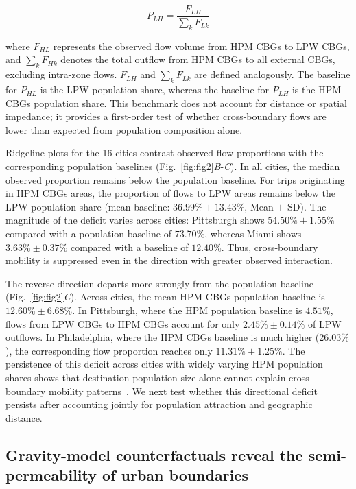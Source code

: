 \documentclass[9pt,twocolumn,twoside]{pnas-new}
\begin{document}
\begin{equation}
	P_{LH} = \frac{F_{LH}}{\sum_{k} F_{Lk}}
\end{equation}

\noindent where $F_{HL}$ represents the observed flow volume from HPM CBGs to LPW CBGs, and $\sum_{k} F_{Hk}$ denotes the total outflow from HPM CBGs to all external CBGs, excluding intra-zone flows. $F_{LH}$ and $\sum_{k} F_{Lk}$ are defined analogously. The baseline for $P_{HL}$ is the LPW population share, whereas the baseline for $P_{LH}$ is the HPM CBGs population share. This benchmark does not account for distance or spatial impedance; it provides a first-order test of whether cross-boundary flows are lower than expected from population composition alone.

Ridgeline plots for the 16 cities contrast observed flow proportions with the corresponding population baselines (Fig.~\ref{fig:fig2}\textit{B}-\textit{C}). In all cities, the median observed proportion remains below the population baseline. For trips originating in HPM CBGs areas, the proportion of flows to LPW areas remains below the LPW population share (mean baseline: $36.99\% \pm 13.43\%$, Mean $\pm$ SD). The magnitude of the deficit varies across cities: Pittsburgh shows $54.50\% \pm 1.55\%$ compared with a population baseline of $73.70\%$, whereas Miami shows $3.63\% \pm 0.37\%$ compared with a baseline of $12.40\%$. Thus, cross-boundary mobility is suppressed even in the direction with greater observed interaction.

The reverse direction departs more strongly from the population baseline (Fig.~\ref{fig:fig2}\textit{C}). Across cities, the mean HPM CBGs population baseline is $12.60\% \pm 6.68\%$. In Pittsburgh, where the HPM population baseline is $4.51\%$, flows from LPW CBGs to HPM CBGs account for only $2.45\% \pm 0.14\%$ of LPW outflows. In Philadelphia, where the HPM CBGs baseline is much higher ($26.03\%$), the corresponding flow proportion reaches only $11.31\% \pm 1.25\%$. The persistence of this deficit across cities with widely varying HPM population shares shows that destination population size alone cannot explain cross-boundary mobility patterns~\cite{schlapfer2021universal, xu2018human}. We next test whether this directional deficit persists after accounting jointly for population attraction and geographic distance.

\subsection*{Gravity-model counterfactuals reveal the semi-permeability of urban boundaries}
\end{document}
